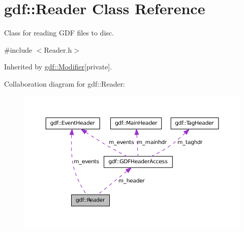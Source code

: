 \hypertarget{classgdf_1_1_reader}{
\section{gdf::Reader Class Reference}
\label{classgdf_1_1_reader}
}


Class for reading GDF files to disc.  




{\ttfamily \#include $<$Reader.h$>$}



Inherited by \hyperlink{classgdf_1_1_modifier}{gdf::Modifier}{\ttfamily  \mbox{[}private\mbox{]}}.



Collaboration diagram for gdf::Reader:
\nopagebreak
\begin{figure}[H]
\begin{center}
\leavevmode
\includegraphics[width=400pt]{classgdf_1_1_reader__coll__graph}
\end{center}
\end{figure}
